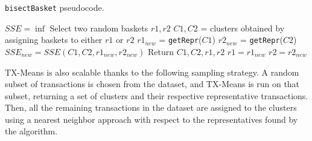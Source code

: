 \begin{algorithm}
\caption{\texttt{bisectBasket} pseudocode.}
\begin{algorithmic}[1]
    \State $SSE = \inf$
    \State Select two random baskets $r1,r2$
        \State $C1,C2$ = clusters obtained by assigning baskets to either $r1$ or $r2$
        \State $r1_{new}$ = \texttt{getRepr}($C1$)
        \State $r2_{new}$ = \texttt{getRepr}($C2$)
        \State $SSE_{new} = SSE(C1,C2,r1_{new},r2_{new})$
            \State Return $C1,C2,r1,r2$
        \EndIf
        \State $r1 = r1_{new}$
        \State $r2 = r2_{new}$
    \EndWhile
\end{algorithmic}
\end{algorithm}
TX-Means is also scalable thanks to the following sampling strategy. A random subset of transactions is chosen from the dataset, and TX-Means is run on that subset, returning a set of clusters and their respective representative transactions. Then, all the remaining transactions in the dataset are assigned to the clusters using a nearest neighbor approach with respect to the representatives found by the algorithm.